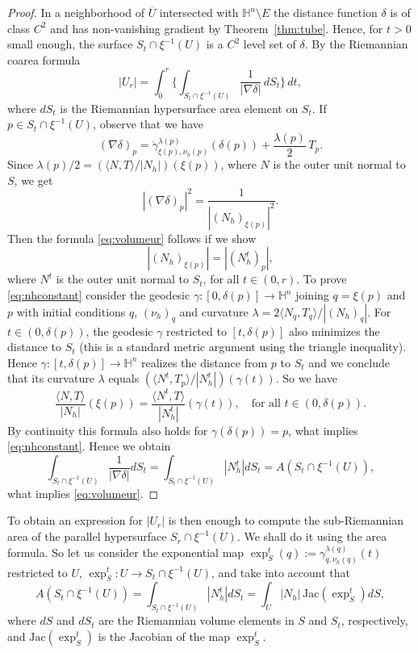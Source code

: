 \documentclass[10pt]{amsart}
\theoremstyle{definition}
\theoremstyle{remark}
\numberwithin{equation}{section}
\begin{document}
\begin{proof}
In a neighborhood of $\overline{U}$ intersected with ${{\mathbb{H}}}^n\setminus E$ the distance function $\delta$ is of class $C^2$ and has non-vanishing gradient by Theorem~\ref{thm:tube}. Hence, for $t>0$ small enough, the surface $S_t\cap\xi^{-1}(U)$ is a $C^2$ level set of $\delta$. By the Riemannian coarea formula
\[
|U_r|=\int_0^r\bigg\{\int_{S_t\cap\xi^{-1}(U)}\frac{1}{|\nabla\delta|}\,dS_t\bigg\}\,dt,
\]
where $dS_t$ is the Riemannian hypersurface area element on $S_t$. If $p\in S_t\cap\xi^{-1}(U)$, observe that we have
\[
(\nabla\delta)_p=\dot{\gamma}_{\xi(p),{\nu_{h}}(p)}^{{\lambda}(p)}(\delta(p))+\frac{{\lambda}(p)}{2}\,T_p.
\]
Since ${\lambda}(p)/2=({\langle{N,T}\rangle}/|N_h|)(\xi(p))$, where $N$ is the outer unit normal to $S$, we get
\[
|(\nabla\delta)_p|^2=\frac{1}{|(N_h)_{\xi(p)}|^2}.
\]
Then the formula \eqref{eq:volumeur} follows if we show
\begin{equation}
\label{eq:nhconstant}
|(N_h)_{\xi(p)}|=|(N^t_h)_p|,
\end{equation}
where $N^t$ is the outer unit normal to $S_t$, for all $t\in (0,r)$. To prove \eqref{eq:nhconstant} consider the geodesic ${\gamma}:[0,\delta(p)]\to{{\mathbb{H}}}^n$ joining $q=\xi(p)$ and $p$ with initial conditions $q$, $({\nu_{h}})_q$ and curvature $	{\lambda}=2{\langle{N_q,T_q}\rangle}/|(N_h)_q|$. For $t\in (0,\delta(p))$, the geodesic ${\gamma}$ restricted to $[t,\delta(p)]$ also minimizes the distance to $S_t$ (this is a standard metric argument using the triangle inequality). Hence ${\gamma}:[t,\delta(p)]\to{{\mathbb{H}}}^n$ realizes the distance from $p$ to $S_t$ and we conclude that its curvature ${\lambda}$ equals $({\langle{N^t,T_p}\rangle}/|N^t_h|)({\gamma}(t))$. So we have 
\[
\frac{{\langle{N,T}\rangle}}{|N_h|}(\xi(p))=\frac{{\langle{N^t,T}\rangle}}{|N^t_h|}({\gamma}(t)),\quad\text{for all }t\in (0,\delta(p)).
\]
By continuity this formula also holds for ${\gamma}(\delta(p))=p$, what implies \eqref{eq:nhconstant}. Hence we obtain
\[
\int_{S_t\cap\xi^{-1}(U)}\frac{1}{|\nabla\delta|}dS_t=\int_{S_t\cap\xi^{-1}(U)}|N^t_h|dS_t=A(S_t\cap\xi^{-1}(U)),
\]
what implies \eqref{eq:volumeur}.
\end{proof}

To obtain an expression for $|U_r|$ is then enough to compute the sub-Riemannian area of the parallel hypersurface $S_r\cap\xi^{-1}(U)$. We shall do it using the area formula. So let us consider the exponential map $\exp_S^t(q):={\gamma}_{q,{\nu_{h}}(q)}^{{\lambda}(q)}(t)$ restricted to $U$, $\exp^t_S:U\to S_t\cap\xi^{-1}(U)$, and take into account that
\[
A(S_t\cap\xi^{-1}(U))=\int_{S_t\cap\xi^{-1}(U)}|N^t_h|dS_t
=\int_U|N_h|\,\text{Jac}(\exp_S^t)dS,
\]
where $dS$ and $dS_t$ are the Riemannian volume elements in $S$ and $S_t$, respectively, and $\text{Jac}(\exp_S^t)$ is the Jacobian of the map $\exp_S^t$.
\end{document}
